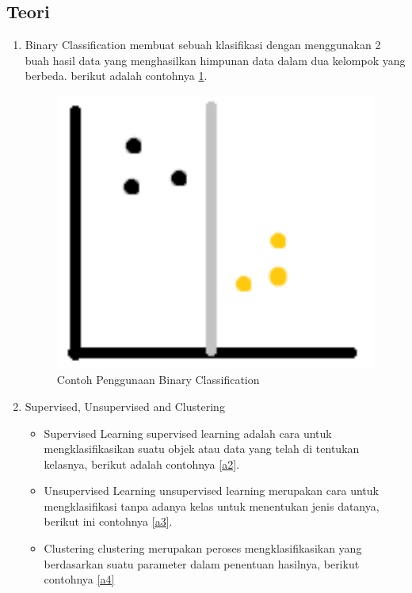 \subsection{Teori}
\begin{enumerate}

\item Binary Classification
\subitem
membuat sebuah klasifikasi dengan menggunakan 2 buah hasil data yang menghasilkan himpunan data dalam dua kelompok yang berbeda. berikut adalah contohnya \ref{a1}.
\begin{figure}
\centerline{\includegraphics[width=1\textwidth]{figures/fathi/chapter2/1.PNG}}
\caption{Contoh Penggunaan Binary Classification}
\label{a1}
\end{figure}

\item Supervised, Unsupervised and Clustering
\begin{itemize}
\item Supervised Learning
supervised learning adalah cara untuk mengklasifikasikan suatu objek atau data yang telah di tentukan kelasnya, berikut adalah contohnya \ref{a2}.
\item Unsupervised Learning
unsupervised learning merupakan cara untuk mengklasifikasi tanpa adanya kelas untuk menentukan jenis datanya, berikut ini contohnya \ref{a3}.
\item Clustering
clustering merupakan peroses mengklasifikasikan yang berdasarkan suatu parameter dalam penentuan hasilnya, berikut contohnya \ref{a4}
\end{itemize}


\end{enumerate}

